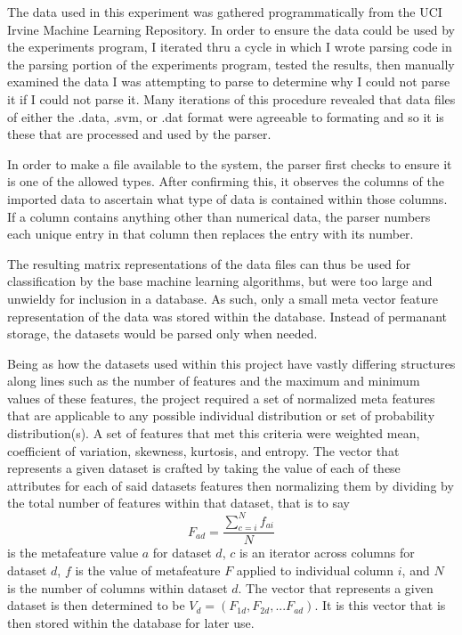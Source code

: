 \documentclass{article}
\begin{document}
The data used in this experiment was gathered programmatically from the UCI
Irvine Machine Learning Repository. In order to ensure the data could be used
by the experiments program, I iterated thru a cycle in which I wrote
parsing code in the parsing portion of the experiments program, tested the
results, then manually examined the data I was attempting to parse to determine
why I could not parse it if I could not parse it. Many iterations of this
procedure revealed that data files of either the .data, .svm, or .dat format were agreeable
to formating and so it is these that are processed and used by the parser.

In order to make a file available to the system, the parser first checks to
ensure it is one of the allowed types. After confirming this, it observes the
columns of the imported data to ascertain what type of data is contained within
those columns. If a column contains anything other than numerical data,
the parser numbers each unique entry in that column then replaces the entry with
its number.

The resulting matrix representations of the data files can thus be used for
classification by the base machine learning algorithms, but were too large and
unwieldy for inclusion in a database. As such, only a small meta vector feature
representation of the data was stored within the database. Instead of permanant
storage, the datasets would be parsed only when needed.

Being as how the datasets used within this project have vastly differing
structures along lines such as the number of features and the maximum and
minimum values of these features, the project required a set of
normalized meta features that are applicable to any possible individual
distribution or set of probability distribution(s). A set of features that met
this criteria were weighted mean, coefficient of variation, skewness, kurtosis,
and entropy. The vector that represents a given dataset is crafted by taking the
value of each of these attributes for each of said datasets features then
normalizing them by dividing by the total number of features within that dataset,
that is to say
$$F_{ad} = \frac{\sum_{c=i}^{N}f_{ai}}{N}$$
is the metafeature value $a$ for dataset $d$, $c$ is an iterator across columns
for dataset $d$, $f$ is the value of metafeature $F$ applied to individual
column $i$, and $N$ is the number of columns within dataset $d$. The vector that
represents a given dataset is then determined to be
$V_d = (F_{1d}, F_{2d},...F_{ad})$. It is this vector that is then stored within
the database for later use.
\end{document}
